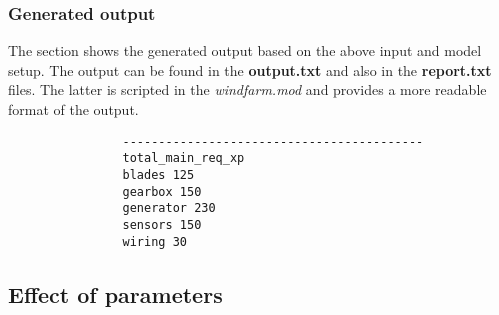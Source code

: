        \subsubsection{Generated output}
        The section shows the generated output based on the above input and model setup. The output 
        can be found in the \textbf{output.txt} and also in the \textbf{report.txt} files. The latter
        is scripted in the \textit{windfarm.mod} and provides a more readable format of the output.

        \begin{listing}[htbp]
            \begin{verbatim}
                ------------------------------------------
                total_main_req_xp
                blades 125
                gearbox 150
                generator 230
                sensors 150
                wiring 30
            \end{verbatim}
        \end{listing}

    \subsection{Effect of parameters}
